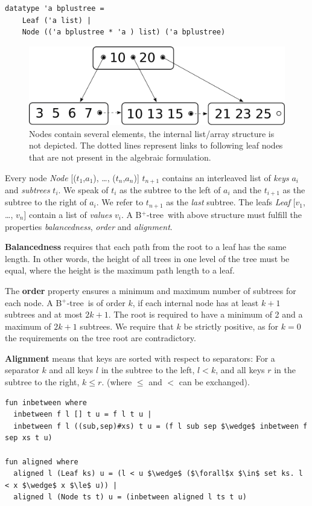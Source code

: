 \documentclass[a4paper,UKenglish,cleveref, autoref, thm-restate]{lipics-v2021}
\newcommand{\btree}{B$^+$-tree}
\begin{document}
\begin{lstlisting}[mathescape=true, language=Isabelle,label=lst:btree-def]
datatype 'a bplustree =
    Leaf ('a list) |
    Node (('a bplustree * 'a ) list) ('a bplustree)
\end{lstlisting}


\begin{figure}
    \centering
    \includegraphics[width=0.5\linewidth]{btree-basic-nopair.pdf}
    \caption[Visualization of a \btree]
    {Nodes contain several elements, the internal list/array structure is not depicted.
    The dotted lines represent links to following leaf nodes that are not present in the algebraic formulation.}
    \label{fig:btree-basic}
\end{figure}


Every node \emph{Node} [($t_1$,$a_1$), …, ($t_n$,$a_n$)] $t_{n+1}$ contains an interleaved list of \textit{keys} $a_i$ and \textit{subtrees} $t_i$.
We speak of $t_i$ as the subtree to the left of $a_i$ and
the $t_{i+1}$ as the subtree to the right of $a_i$.
We refer to $t_{n+1}$ as the \textit{last} subtree.
The leafs \emph{Leaf} [$v_1$, …, $v_n$] contain a list of \textit{values} $v_i$.
A \btree\ with above structure must fulfill the properties
\textit{balancedness}, \textit{order} and \textit{alignment}.

\textbf{Balancedness} requires
that each path from the root to a leaf has the same length.
In other words, the height of all trees in one level of the tree must be equal,
where the height is the maximum path length to a leaf.

The \textbf{order} property ensures a minimum and maximum
number of subtrees for each node.
A \btree\ is of order $k$, if each internal node has at least $k+1$
subtrees and at most $2k+1$.
The root is required to have a minimum of 2 and a maximum of $2k+1$ subtrees.
We require that $k$ be strictly positive, as for $k = 0$ the requirements on the tree
root are contradictory.

\textbf{Alignment} means that keys are sorted with respect to separators:
For a separator $k$ and all keys $l$ in the subtree to the left, $l < k$,
and all keys $r$ in the subtree to the right, $k \leq r$.
(where $\leq$ and $<$ can be exchanged).

\begin{lstlisting}[mathescape=true, language=Isabelle,label=lst:btree-alignment-def]
fun inbetween where
  inbetween f l [] t u = f l t u |
  inbetween f l ((sub,sep)#xs) t u = (f l sub sep $\wedge$ inbetween f sep xs t u)

fun aligned where
  aligned l (Leaf ks) u = (l < u $\wedge$ ($\forall$x $\in$ set ks. l < x $\wedge$ x $\le$ u)) |
  aligned l (Node ts t) u = (inbetween aligned l ts t u)
\end{lstlisting}
\end{document}

